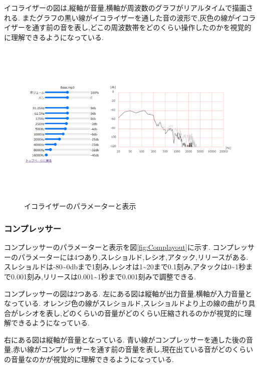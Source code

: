 \documentclass[12pt,a4j,titlepage]{ltjsarticle}
\begin{document}
イコライザーの図は,縦軸が音量,横軸が周波数のグラフがリアルタイムで描画される.
またグラフの黒い線がイコライザーを通した音の波形で,灰色の線がイコライザーを通す前の音を表し,どこの周波数帯をどのくらい操作したのかを視覚的に理解できるようになっている.

\begin{figure}[H]
\centering
 \includegraphics[width=150mm]{./figures/EQlayout.pdf}
 \caption{イコライザーのパラメーターと表示}
 \label{fig:EQlayout}
\end{figure}

\subsubsection{コンプレッサー}
コンプレッサーのパラメーターと表示を図\ref{fig:Complayout}に示す.
コンプレッサーのパラメーターには4つあり,スレショルド,レシオ,アタック,リリースがある.
スレショルドは-80\sim0dbまで1刻み,レシオは1\sim20まで0.1刻み,アタックは0\sim1秒まで0.001刻み,リリースは0.001\sim1秒まで0.001刻みで調整できる.

コンプレッサーの図は2つある.
左にある図は縦軸が出力音量,横軸が入力音量となっている.
オレンジ色の線がスレショルド,スレショルドより上の線の曲がり具合がレシオを表し,どのくらいの音量がどのくらい圧縮されるのかが視覚的に理解できるようになっている.

右にある図は縦軸が音量となっている.
青い線がコンプレッサーを通した後の音量,赤い線がコンプレッサーを通す前の音量を表し,現在出ている音がどのくらいの音量なのかが視覚的に理解できるようになっている.
\end{document}
